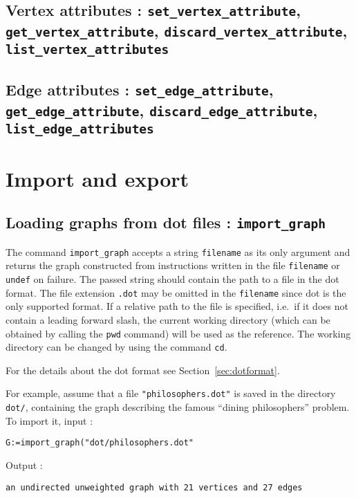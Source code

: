 \documentclass[a4paper,11pt]{article}
\begin{document}
\subsection{Vertex attributes : {\tt set\_vertex\_attribute}, {\tt get\_vertex\_attribute}, {\tt discard\_vertex\_attribute}, {\tt list\_vertex\_attributes}}

\subsection{Edge attributes : {\tt set\_edge\_attribute}, {\tt get\_edge\_attribute}, {\tt discard\_edge\_attribute}, {\tt list\_edge\_attributes}}

\section{Import and export}

\subsection{Loading graphs from {\sf dot} files : {\tt import\_graph}}

The command {\tt import\_graph} accepts a string {\tt filename} as its only argument and returns the graph constructed from instructions written in the file {\tt filename} or {\tt undef} on failure. The passed string should contain the path to a file in the {\sf dot} format. The file extension {\tt .dot} may be omitted in the {\tt filename} since {\sf dot} is the only supported format. If a relative path to the file is specified, i.e.~if it does not contain a leading forward slash, the current working directory (which can be obtained by calling the {\tt pwd} command) will be used as the reference. The working directory can be changed by using the command {\tt cd}.

For the details about the {\sf dot} format see Section~\ref{sec:dotformat}.

For example, assume that a file {\tt "philosophers.dot"} is saved in the directory {\tt dot/}, containing the graph describing the famous ``dining philosophers'' problem. To import it, input :
\begin{center}
  \tt G:=import\_graph("dot/philosophers.dot"
\end{center}
Output :
\begin{center}
  \tt an undirected unweighted graph with 21 vertices and 27 edges
\end{center}
\end{document}
